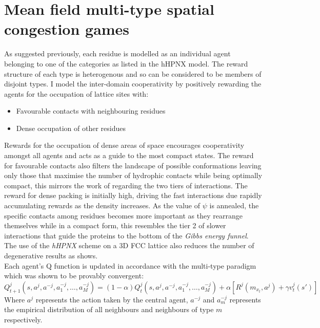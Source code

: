 \section{Mean field multi-type spatial congestion games}
As suggested previously, each residue is modelled as an individual agent belonging to one of the
categories as listed in the hHPNX model. The reward structure of each type is heterogenous and so can be considered
to be members of disjoint types. I model the inter-domain cooperativity by positively rewarding
the agents for the occupation of lattice sites with:
\begin{itemize}
    \item Favourable contacts with neighbouring residues 
    \item Dense occupation of other residues
\end{itemize}
Rewards for the occupation of dense areas of space encourages cooperativity amongst all
agents and acts as a guide to the most compact states. The reward for favourable contacts
also filters the landscape of possible conformations leaving only those that maximise
the number of hydrophic contacts while being optimally compact, this mirrors the
work of \cite{Yang} regarding the two tiers of interactions. The reward for
dense packing is initially high, driving the fast interactions due rapidly
accumulating rewards as the density increases. As the value of $\psi$ is annealed,
the specific contacts among residues becomes more important as they rearrange themselves
while in a compact form, this resembles the tier 2 of slower interactions that guide the 
proteins to the bottom of the \emph{Gibbs energy funnel}. The use of the \emph{hHPNX} scheme
on a 3D FCC lattice also reduces the number of degenerative results as \cite{Hoque} shows.\\

Each agent's Q function is updated in accordance with the multi-type paradigm which was shown to be provably convergent:
\begin{equation}
    Q^j_{t+1}(s,a^j,a^{-j}, a^{-j}_1, \hdots , a^{-j}_M)= (1-\alpha)Q^j_t(s,a^j,a^{-j}, a^{-j}_1, \hdots , a^{-j}_M) +\alpha[R^j(m_{x_t}, a^j)+ \gamma v^j_t(s')]
\end{equation}
Where $a^j$ represents the action taken by the central agent, $a^{-j}$ and $a^{-j}_m$ represents
the empirical distribution of all neighbours and neighbours of type $m$ respectively.
